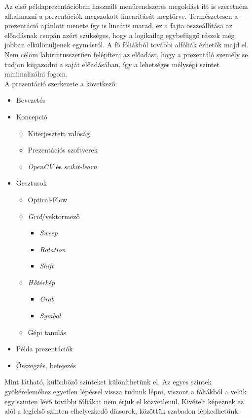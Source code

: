 Az első példaprezentációban használt menürendszeres megoldást itt is szeretném alkalmazni a prezentációk megszokott linearitását megtörve. Természetesen a prezentáció ajánlott menete így is lineáris marad, ez a fajta öszzeállítása az előadásnak csupán azért szükséges, hogy a logikailag egybefüggő részek még jobban elkülönüljenek egymástól. A fő fóliákból további alfóliák érhetők majd el. Nem célom labirintusszerűen felépíteni az előadást, hogy a prezentáló személy se tudjon kiigazodni a saját előadásában, így a lehetséges mélységi szintet minimalizálni fogom.\\
A prezentáció szerkezete a következő:
\begin{itemize}
	\item Bevezetés
	\item Koncepció
		\begin{itemize}
			\item Kiterjesztett valóság
			\item Prezentációs szoftverek
			\item \textit{OpenCV} és \textit{scikit-learn}
		\end{itemize}
	\item Gesztusok
		\begin{itemize}
			\item Optical-Flow
			\item \textit{Grid}/vektormező
				\begin{itemize}
					\item \textit{Sweep}
					\item \textit{Rotation}
					\item \textit{Shift}
				\end{itemize}
			\item \textit{Hőtérkép}
				\begin{itemize}
					\item \textit{Grab}
					\item \textit{Symbol}
				\end{itemize}
			\item Gépi tanulás
		\end{itemize}
	\item Példa prezentációk
	\item Összegzés, befejezés
\end{itemize}
Mint látható, különböző szinteket különíthetünk el. Az egyes szintek gyökéreleméhez egyetlen lépéssel vissza tudunk lépni, viszont a fóliákból a velük egy szinten lévő további fóliákat nem érjük el közvetlenül. Kivételt képeznek ez alól a legfelső szinten elhelyezkedő diasorok, közöttük szabadon lépkedhetünk.

